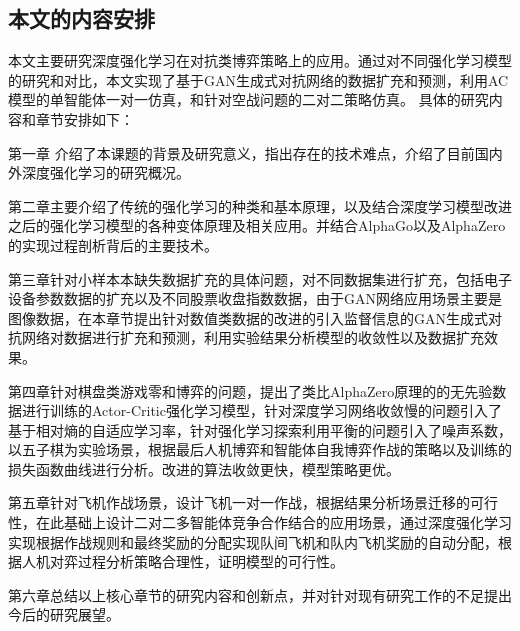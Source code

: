 \subsection{本文的内容安排}
本文主要研究深度强化学习在对抗类博弈策略上的应用。通过对不同强化学习模型的研究和对比，本文实现了基于GAN生成式对抗网络的数据扩充和预测，利用AC模型的单智能体一对一仿真，和针对空战问题的二对二策略仿真。
具体的研究内容和章节安排如下：

第一章 介绍了本课题的背景及研究意义，指出存在的技术难点，介绍了目前国内外深度强化学习的研究概况。

第二章主要介绍了传统的强化学习的种类和基本原理，以及结合深度学习模型改进之后的强化学习模型的各种变体原理及相关应用。并结合AlphaGo以及AlphaZero的实现过程剖析背后的主要技术。

第三章针对小样本本缺失数据扩充的具体问题，对不同数据集进行扩充，包括电子设备参数数据的扩充以及不同股票收盘指数数据，由于GAN网络应用场景主要是图像数据，在本章节提出针对数值类数据的改进的引入监督信息的GAN生成式对抗网络对数据进行扩充和预测，利用实验结果分析模型的收敛性以及数据扩充效果。

第四章针对棋盘类游戏零和博弈的问题，提出了类比AlphaZero原理的的无先验数据进行训练的Actor-Critic强化学习模型，针对深度学习网络收敛慢的问题引入了基于相对熵的自适应学习率，针对强化学习探索利用平衡的问题引入了噪声系数，以五子棋为实验场景，根据最后人机博弈和智能体自我博弈作战的策略以及训练的损失函数曲线进行分析。改进的算法收敛更快，模型策略更优。

第五章针对飞机作战场景，设计飞机一对一作战，根据结果分析场景迁移的可行性，在此基础上设计二对二多智能体竞争合作结合的应用场景，通过深度强化学习实现根据作战规则和最终奖励的分配实现队间飞机和队内飞机奖励的自动分配，根据人机对弈过程分析策略合理性，证明模型的可行性。

第六章总结以上核心章节的研究内容和创新点，并对针对现有研究工作的不足提出今后的研究展望。

